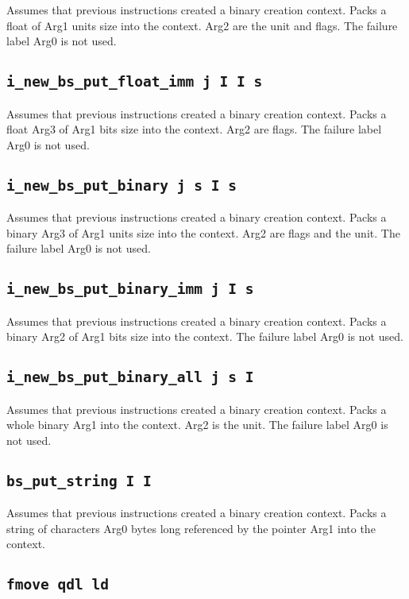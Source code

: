 \documentclass{article}
\newcommand{\iop}[1]{\texttt{#1}}
\begin{document}
Assumes that previous instructions created a binary creation context. Packs a
float of Arg1 units size into the context. Arg2 are the unit and flags. The
failure label Arg0 is not used.

\subsection*{\iop{i\_new\_bs\_put\_float\_imm j I I s}}

Assumes that previous instructions created a binary creation context. Packs a
float Arg3 of Arg1 bits size into the context. Arg2 are flags. The failure label Arg0
is not used.

\subsection*{\iop{i\_new\_bs\_put\_binary j s I s}}

Assumes that previous instructions created a binary creation context. Packs a
binary Arg3 of Arg1 units size into the context. Arg2 are flags and the unit.
The failure label Arg0 is not used.

\subsection*{\iop{i\_new\_bs\_put\_binary\_imm j I s}}

Assumes that previous instructions created a binary creation context. Packs a
binary Arg2 of Arg1 bits size into the context. The failure label Arg0 is not
used.

\subsection*{\iop{i\_new\_bs\_put\_binary\_all j s I}}

Assumes that previous instructions created a binary creation context. Packs a
whole binary Arg1 into the context. Arg2 is the unit. The failure label Arg0 is
not used.

\subsection*{\iop{bs\_put\_string I I}}

Assumes that previous instructions created a binary creation context. Packs a
string of characters Arg0 bytes long referenced by the pointer Arg1 into the
context.

\subsection*{\iop{fmove qdl ld}}
\end{document}
